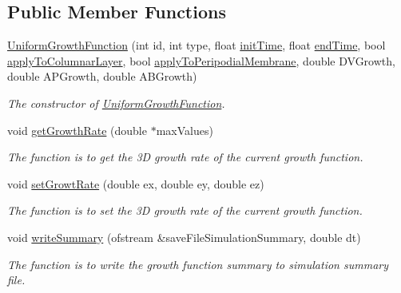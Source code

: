 \subsection*{Public Member Functions}
\begin{DoxyCompactItemize}
\item 
\hyperlink{classUniformGrowthFunction_af74d0e65f1a9486a78871306f99e4eb1}{Uniform\+Growth\+Function} (int id, int type, float \hyperlink{classGrowthFunctionBase_ae92513a7b41637df8e26e7db35ddf97c}{init\+Time}, float \hyperlink{classGrowthFunctionBase_a3ff4db0573d354a75666a5f3ca446941}{end\+Time}, bool \hyperlink{classGrowthFunctionBase_a3d56771e7c145589a14e11cc331e0326}{apply\+To\+Columnar\+Layer}, bool \hyperlink{classGrowthFunctionBase_a08ae19f58cb98fa8e315a77f52749732}{apply\+To\+Peripodial\+Membrane}, double D\+V\+Growth, double A\+P\+Growth, double A\+B\+Growth)
\begin{DoxyCompactList}\small\item\em The constructor of \hyperlink{classUniformGrowthFunction}{Uniform\+Growth\+Function}. \end{DoxyCompactList}\item 
void \hyperlink{classUniformGrowthFunction_ad5be18ae004a3eed205ab3570e13202a}{get\+Growth\+Rate} (double $\ast$max\+Values)
\begin{DoxyCompactList}\small\item\em The function is to get the 3\+D growth rate of the current growth function. \end{DoxyCompactList}\item 
void \hyperlink{classUniformGrowthFunction_aff899907569af697d47927f61b6871a5}{set\+Growt\+Rate} (double ex, double ey, double ez)
\begin{DoxyCompactList}\small\item\em The function is to set the 3\+D growth rate of the current growth function. \end{DoxyCompactList}\item 
void \hyperlink{classUniformGrowthFunction_a227ffb3a524779628f98f110d3811399}{write\+Summary} (ofstream \&save\+File\+Simulation\+Summary, double dt)
\begin{DoxyCompactList}\small\item\em The function is to write the growth function summary to simulation summary file. \end{DoxyCompactList}\end{DoxyCompactItemize}
